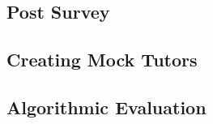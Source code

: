 \subsection{Post Survey}
\label{sec:post-survey}


\subsection{Creating Mock Tutors}
\label{sec:mock}


\subsection{Algorithmic Evaluation}
\label{sec:algor-eval}


